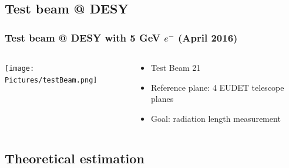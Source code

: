 \documentclass{beamer}
\begin{document}
  \subsection{Test beam @ DESY}

  \begin{frame}
    \frametitle{Test beam @ DESY with 5 GeV $e^-$ (April 2016)}
    
    \begin{columns}[c]
      \begin{column}{5cm}
        \begin{center}
          \texttt{[image: Pictures/testBeam.png]}
        \end{center}
      \end{column}
      \begin{column}{5cm}
        \begin{itemize}
          \item Test Beam 21
          \item Reference plane: 4 EUDET telescope planes
          \item Goal: radiation length measurement
        \end{itemize}
      \end{column}
    \end{columns}
  \end{frame}

  \subsection{Theoretical estimation}
  
\end{document}
